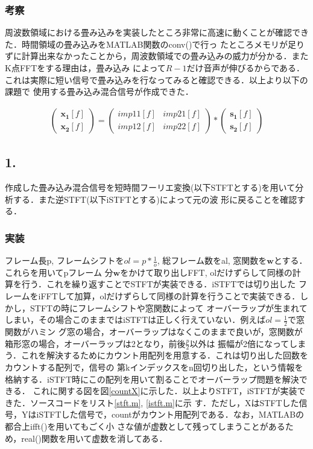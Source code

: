 \documentclass[a4j]{jarticle}
\begin{document}
\subsubsection*{考察}
周波数領域における畳み込みを実装したところ非常に高速に動くことが確認できた．時間領域の畳み込みをMATLAB関数のconv()で行っ
たところメモリが足りずに計算出来なかったことから，周波数領域での畳み込みの威力が分かる．またK点FFTをする理由は，畳み込み
によって$R-1$だけ音声が伸びるからである．これは実際に短い信号で畳み込みを行なってみると確認できる．以上より以下の課題で
使用する畳み込み混合信号が作成できた．

\begin{eqnarray}
\left(
 \begin{array}{cc}
  \bm{x_1}[f]\\
  \bm{x_2}[f]
 \end{array}
\right)
=
\left(
 \begin{array}{cc}
  imp11[f] & imp21[f]\\
  imp12[f] & imp22[f]
 \end{array}
\right)
*
\left(
 \begin{array}{cc}
  \bm{s_1}[f]\\
  \bm{s_2}[f]
 \end{array}
\right)
\end{eqnarray}

\subsection*{1.}
作成した畳み込み混合信号を短時間フーリエ変換(以下STFTとする)を用いて分析する．また逆STFT(以下iSTFTとする)によって元の波
形に戻ることを確認する．
\subsubsection*{実装}
フレーム長p, フレームシフトを$ol = p * \frac{1}{o}$, 総フレーム数をal, 窓関数を$\bm{w}$とする．これらを用いてpフレーム
分$\bm{w}$をかけて取り出しFFT, olだけずらして同様の計算を行う．これを繰り返すことでSTFTが実装できる．iSTFTでは切り出した
フレームをiFFTして加算，olだけずらして同様の計算を行うことで実装できる．しかし，STFTの時にフレームシフトや窓関数によって
オーバーラップが生まれてしまい，その場合このままではiSTFTは正しく行えていない．例えば$ol = \frac{1}{2}$で窓関数がハミン
グ窓の場合，オーバーラップはなくこのままで良いが，窓関数が箱形窓の場合，オーバーラップは2となり，前後$\frac{p}{2}$以外は
振幅が2倍になってしまう．これを解決するためにカウント用配列を用意する．これは切り出した回数をカウントする配列で，信号の
第kインデックスをn回切り出した，という情報を格納する．iSTFT時にこの配列を用いて割ることでオーバーラップ問題を解決できる．
これに関する図を図\ref{countX}に示した．以上よりSTFT，iSTFTが実装できた．ソースコードをリスト\ref{stft.m}, \ref{istft.m}に示
す．ただし，XはSTFTした信号，YはiSTFTした信号で，countがカウント用配列である．なお，MATLABの都合上ifft()を用いてもごく小
さな値が虚数として残ってしまうことがあるため，real()関数を用いて虚数を消してある．
\end{document}
